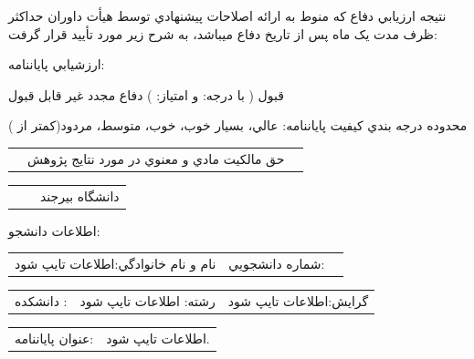 \noindent نتيجه ارزيابي دفاع که منوط به ارائه اصلاحات پيشنهادي توسط هيأت داوران حداکثر ظرف مدت يک ماه پس از تاريخ دفاع ميباشد، به شرح زير مورد تأييد قرار گرفت:\par\smallskip
\noindent ارزشيابي پاياننامه:\par\smallskip
\noindent  قبول ( با درجه:                             و امتياز:                                )                          دفاع مجدد                 غير قابل قبول\par محدوده درجه بندي کيفيت پاياننامه: عالي،  بسيار خوب، خوب، متوسط، مردود(کمتر از )\par\smallskip
\endgroup
\clearpage\begingroup\fontsize{10}{12}\selectfont{}
\noindent\begin{tabular}{@{}p{\dimexpr(\linewidth-6\tabcolsep)/3\relax}p{\dimexpr(\linewidth-6\tabcolsep)/3\relax}p{\dimexpr(\linewidth-6\tabcolsep)/3\relax}@{}}
 & حق مالکيت مادي و معنوي در مورد نتايج پژوهش &  \\
\end{tabular}\par\smallskip
\noindent\begin{tabular}{@{}p{\dimexpr(\linewidth-6\tabcolsep)/3\relax}p{\dimexpr(\linewidth-6\tabcolsep)/3\relax}p{\dimexpr(\linewidth-6\tabcolsep)/3\relax}@{}}
 &  & دانشگاه بيرجند \\
\end{tabular}\par\smallskip
\noindent اطلاعات دانشجو:\par\smallskip
\noindent\begin{tabular}{@{}p{\dimexpr(\linewidth-6\tabcolsep)/3\relax}p{\dimexpr(\linewidth-6\tabcolsep)/3\relax}p{\dimexpr(\linewidth-6\tabcolsep)/3\relax}@{}}
نام و نام خانوادگي:اطلاعات تايپ شود & شماره دانشجويي:\StudentNumber{} &  \\
\end{tabular}\par\smallskip
\noindent\begin{tabular}{@{}p{\dimexpr(\linewidth-6\tabcolsep)/3\relax}p{\dimexpr(\linewidth-6\tabcolsep)/3\relax}p{\dimexpr(\linewidth-6\tabcolsep)/3\relax}@{}}
دانشکده \FacultyName{}:   & رشته: اطلاعات تايپ شود & گرايش:اطلاعات تايپ شود \\
\end{tabular}\par\smallskip
\noindent\begin{tabular}{@{}p{\dimexpr(\linewidth-4\tabcolsep)/2\relax}p{\dimexpr(\linewidth-4\tabcolsep)/2\relax}@{}}
عنوان پاياننامه: & اطلاعات تايپ شود. \\
\end{tabular}\par\smallskip
